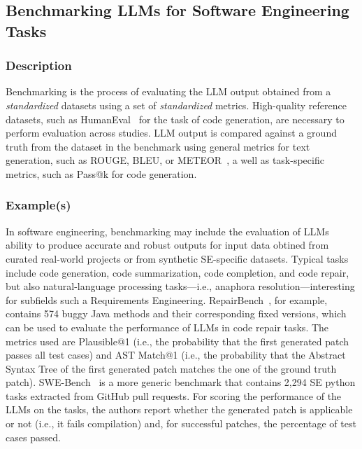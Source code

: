 \documentclass[11pt]{article}
\begin{document}
\subsection{Benchmarking LLMs for Software Engineering Tasks}

\subsubsection{Description}

Benchmarking is the process of evaluating the LLM output obtained from a \emph{standardized} datasets using a set of \emph{standardized} metrics.
High-quality reference datasets, such as HumanEval~\cite{DBLP:journals/corr/abs-2107-03374} for the task of code generation, are necessary to perform evaluation across studies.
LLM output is compared against a ground truth from the dataset in the benchmark using general metrics for text generation, such as ROUGE, BLEU, or METEOR~\cite{10.1145/3695988}, a well as task-specific metrics, such as Pass@k for code generation.

\subsubsection{Example(s)}

In software engineering, benchmarking may include the evaluation of LLMs ability to produce accurate and robust outputs for input data obtined from curated real-world projects or from synthetic SE-specific datasets. Typical tasks include code generation, code summarization, code completion, and code repair, but also natural-language processing tasks---i.e., anaphora resolution---interesting for subfields such a Requirements Engineering. 
RepairBench~\cite{silva2024repairbench}, for example, contains 574 buggy Java methods and their corresponding fixed versions, which can be used to evaluate the performance of LLMs in code repair tasks.
The metrics used are Plausible@1 (i.e., the probability that the first generated patch passes all test cases) and AST Match@1 (i.e., the probability that the Abstract Syntax Tree of the first generated patch matches the one of the ground truth patch).
SWE-Bench~\cite{DBLP:conf/iclr/JimenezYWYPPN24} is a more generic benchmark that contains 2,294 SE python tasks extracted from GitHub pull requests.
For scoring the performance of the LLMs on the tasks, the authors report whether the generated patch is applicable or not (i.e., it fails compilation) and, for successful patches, the percentage of test cases passed.
\end{document}
